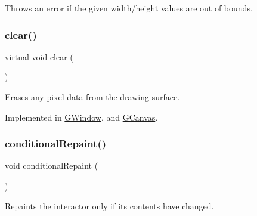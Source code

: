 Throws an error if the given width/height values are out of bounds. 

\mbox{\label{classGDrawingSurface_a5eeb94d22b8366d1b68d0614384802fe}} 
\subsubsection{\texorpdfstring{clear()}{clear()}}
{\footnotesize\ttfamily virtual void clear (\begin{DoxyParamCaption}{ }\end{DoxyParamCaption})\hspace{0.3cm}{\ttfamily [pure virtual]}}



Erases any pixel data from the drawing surface. 



Implemented in \mbox{\hyperlink{classGWindow_af220cadd1499c3586d48010a0348d9f8}{G\+Window}}, and \mbox{\hyperlink{classGCanvas_af220cadd1499c3586d48010a0348d9f8}{G\+Canvas}}.

\mbox{\label{classGDrawingSurface_a221b3e75bb3d9d0bfea62b3364e6773b}} 
\subsubsection{\texorpdfstring{conditional\+Repaint()}{conditionalRepaint()}}
{\footnotesize\ttfamily void conditional\+Repaint (\begin{DoxyParamCaption}{ }\end{DoxyParamCaption})\hspace{0.3cm}{\ttfamily [virtual]}}



Repaints the interactor only if its contents have changed. 

\mbox{\label{classGDrawingSurface_aedd4b792311d946eeaf44b0de337a408}} 
